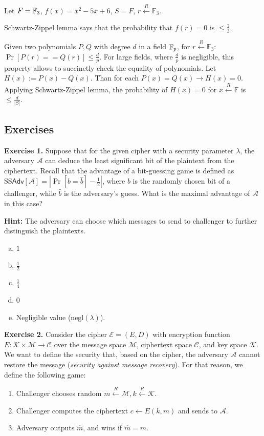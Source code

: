 \documentclass[../lecture-notes.tex]{subfiles}
\begin{document}
\begin{example}
Let $F = \mathbb{F}_3$, $f(x) = x^2 - 5x + 6$, $S = F$, $r \xleftarrow{R} \mathbb{F}_3$.

Schwartz-Zippel lemma says that the probability that $f(r) = 0$ is $\le \frac{2}{3}$.
\end{example}

Given two polynomials $P, Q$ with  degree $d$ in a field $\mathbb{F}_p$, for $r \xleftarrow{R} \mathbb{F}_3$: $\Pr[P(r) == Q(r)] \le \frac{d}{p}$.
For large fields, where  $\frac{d}{p}$ is negligible, this property allows to succinctly check the equality of polynomials.
Let $H(x) := P(x) - Q(x)$. Than for each $P(x) = Q(x) \rightarrow H(x) = 0$. Applying Schwartz-Zippel lemma, 
the probability of $H(x) = 0$ for $x \xleftarrow{R} \mathbb{F} $ is $\le \frac{d}{|S|}$.

\subsection{Exercises}

\textbf{Exercise 1.} Suppose that for the given cipher with a security parameter $\lambda$, the adversary $\mathcal{A}$ can deduce the least significant bit of the plaintext from the ciphertext. Recall that the advantage 
of a bit-guessing game is defined as $\text{SS}\mathsf{Adv}[\mathcal{A}] = \left|\Pr[b=\hat{b}] - \frac{1}{2}\right|$, where $b$ is the randomly chosen bit of a challenger, while 
$\hat{b}$ is the adversary's guess. What is the maximal advantage of $\mathcal{A}$ in this case?

\textbf{Hint:} The adversary can choose which messages to send to challenger to further distinguish the plaintexts.

\begin{enumerate}[a)]
    \item $1$
    \item $\frac{1}{2}$
    \item $\frac{1}{4}$
    \item $0$
    \item Negligible value ($\text{negl}(\lambda)$).
\end{enumerate}

\textbf{Exercise 2.} Consider the cipher $\mathcal{E} = (E,D)$ with encryption function $E: \mathcal{K} \times \mathcal{M} \to \mathcal{C}$ over the message space $\mathcal{M}$, ciphertext space $\mathcal{C}$, and key space $\mathcal{K}$. We want to define the security
that, based on the cipher, the adversary $\mathcal{A}$ cannot restore the message (\textit{security against message recovery}). For that reason, we define the following game:
\begin{enumerate}
    \item Challenger chooses random $m \xleftarrow{R} \mathcal{M}, k \xleftarrow{R} \mathcal{K}$.
    \item Challenger computes the ciphertext $c \gets E(k,m)$ and sends to $\mathcal{A}$.
    \item Adversary outputs $\hat{m}$, and wins if $\hat{m} = m$.
\end{enumerate}
\end{document}
